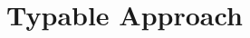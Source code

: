 \documentclass[a4paper,11pt]{article}
\theoremstyle{definition}
\newtheorem{thm}{Theorem}
\begin{document}
                            





\clearpage
\section{Typable Approach}

\end{document}
